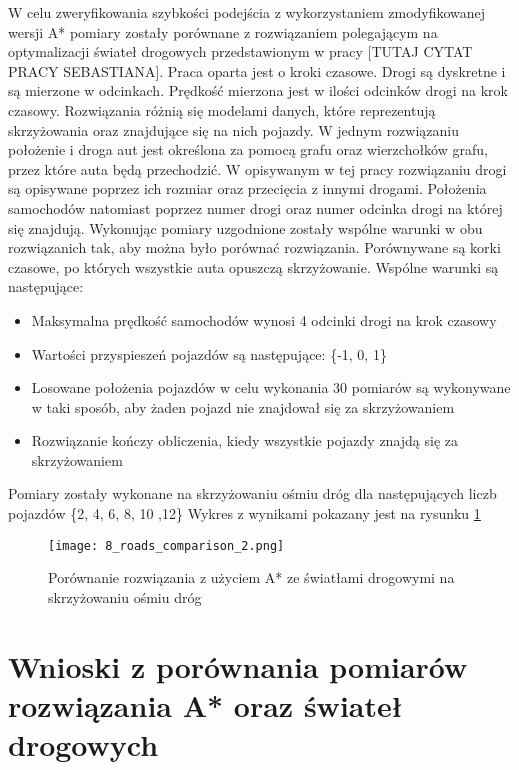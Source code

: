 W celu zweryfikowania szybkości podejścia z wykorzystaniem zmodyfikowanej wersji A* pomiary zostały porównane z rozwiązaniem polegającym na optymalizacji świateł drogowych przedstawionym w pracy [TUTAJ CYTAT PRACY SEBASTIANA]. 
\newline
\newline
Praca oparta jest o kroki czasowe. Drogi są dyskretne i są mierzone w odcinkach. Prędkość mierzona jest w ilości odcinków drogi na krok czasowy.
\newline
\newline
Rozwiązania różnią się modelami danych, które reprezentują skrzyżowania oraz znajdujące się na nich pojazdy. W jednym rozwiązaniu położenie i droga aut jest określona za pomocą grafu oraz wierzchołków grafu, przez które auta będą przechodzić. W opisywanym w tej pracy rozwiązaniu drogi są opisywane poprzez ich rozmiar oraz przecięcia z innymi drogami. Położenia samochodów natomiast poprzez numer drogi oraz numer odcinka drogi na której się znajdują.
\newline
\newline
Wykonując pomiary uzgodnione zostały wspólne warunki w obu rozwiązanich tak, aby można było porównać rozwiązania. Porównywane są korki czasowe, po których wszystkie auta opuszczą skrzyżowanie. Wspólne warunki są następujące:
\begin{itemize}
\item Maksymalna prędkość samochodów wynosi 4 odcinki drogi na krok czasowy
\item Wartości przyspieszeń pojazdów są następujące: \{-1, 0, 1\}
\item Losowane położenia pojazdów w celu wykonania 30 pomiarów są wykonywane w taki sposób, aby żaden pojazd nie znajdował się za skrzyżowaniem
\item Rozwiązanie kończy obliczenia, kiedy wszystkie pojazdy znajdą się za skrzyżowaniem
\end{itemize}
Pomiary zostały wykonane na skrzyżowaniu ośmiu dróg dla następujących liczb pojazdów \{2, 4, 6, 8, 10 ,12\}
\newline
\newline
Wykres z wynikami pokazany jest na rysunku \ref{comparison}
\begin{figure}[H]
  \texttt{[image: 8\_roads\_comparison\_2.png]}
  \caption{Porównanie rozwiązania z użyciem A* ze światłami drogowymi na skrzyżowaniu ośmiu dróg}
  \label{comparison}
\end{figure}

\section{Wnioski z porównania pomiarów rozwiązania A* oraz świateł drogowych}

